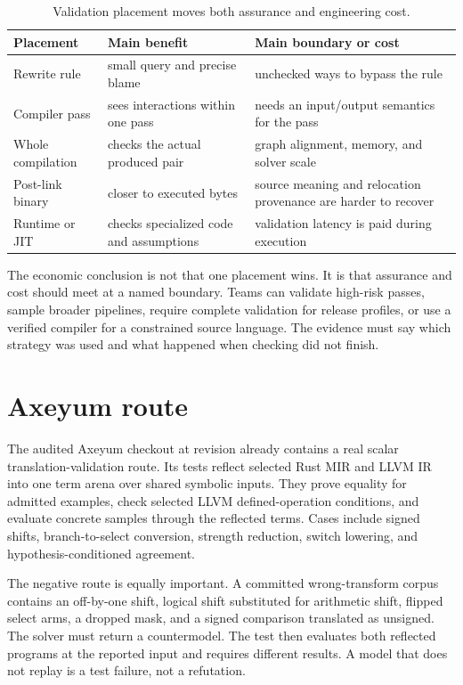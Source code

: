 \begin{table}[htbp]
\centering
\caption{Validation placement moves both assurance and engineering cost.}
\begin{tabular}{@{}p{}p{}p{}@{}}
\toprule
Placement & Main benefit & Main boundary or cost \\
\midrule
Rewrite rule & small query and precise blame & unchecked ways to bypass the rule \\
Compiler pass & sees interactions within one pass & needs an input/output semantics for the pass \\
Whole compilation & checks the actual produced pair & graph alignment, memory, and solver scale \\
Post-link binary & closer to executed bytes & source meaning and relocation provenance are harder to recover \\
Runtime or JIT & checks specialized code and assumptions & validation latency is paid during execution \\
\bottomrule
\end{tabular}
\end{table}

The economic conclusion is not that one placement wins. It is that assurance
and cost should meet at a named boundary. Teams can validate high-risk passes,
sample broader pipelines, require complete validation for release profiles, or
use a verified compiler for a constrained source language. The evidence must
say which strategy was used and what happened when checking did not finish.

\section{Axeyum route}

The audited Axeyum checkout at revision  already contains a
real scalar translation-validation route. Its tests reflect selected Rust MIR
and LLVM IR into one term arena over shared symbolic inputs. They prove equality
for admitted examples, check selected LLVM defined-operation conditions, and
evaluate concrete samples through the reflected terms. Cases include signed
shifts, branch-to-select conversion, strength reduction, switch lowering, and
hypothesis-conditioned agreement.

The negative route is equally important. A committed wrong-transform corpus
contains an off-by-one shift, logical shift substituted for arithmetic shift,
flipped select arms, a dropped mask, and a signed comparison translated as
unsigned. The solver must return a countermodel. The test then evaluates both
reflected programs at the reported input and requires different results. A
model that does not replay is a test failure, not a refutation.

